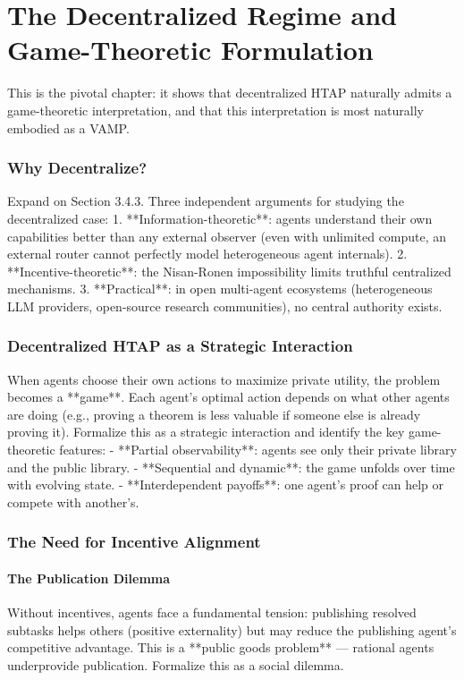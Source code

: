 \chapter{The Decentralized Regime and Game-Theoretic Formulation}\label{chap:decentralized}

This is the pivotal chapter: it shows that decentralized HTAP naturally admits a game-theoretic interpretation, and that this interpretation is most naturally embodied as a VAMP.

\subsection{Why Decentralize?}
Expand on Section 3.4.3. Three independent arguments for studying the decentralized case:
1. **Information-theoretic**: agents understand their own capabilities better than any external observer (even with unlimited compute, an external router cannot perfectly model heterogeneous agent internals).
2. **Incentive-theoretic**: the Nisan-Ronen impossibility limits truthful centralized mechanisms.
3. **Practical**: in open multi-agent ecosystems (heterogeneous LLM providers, open-source research communities), no central authority exists.

\subsection{Decentralized HTAP as a Strategic Interaction}
When agents choose their own actions to maximize private utility, the problem becomes a **game**. Each agent's optimal action depends on what other agents are doing (e.g., proving a theorem is less valuable if someone else is already proving it). Formalize this as a strategic interaction and identify the key game-theoretic features:
- **Partial observability**: agents see only their private library and the public library.
- **Sequential and dynamic**: the game unfolds over time with evolving state.
- **Interdependent payoffs**: one agent's proof can help or compete with another's.

\subsection{The Need for Incentive Alignment}

\subsubsection{The Publication Dilemma}
Without incentives, agents face a fundamental tension: publishing resolved subtasks helps others (positive externality) but may reduce the publishing agent's competitive advantage. This is a **public goods problem** — rational agents underprovide publication. Formalize this as a social dilemma.

